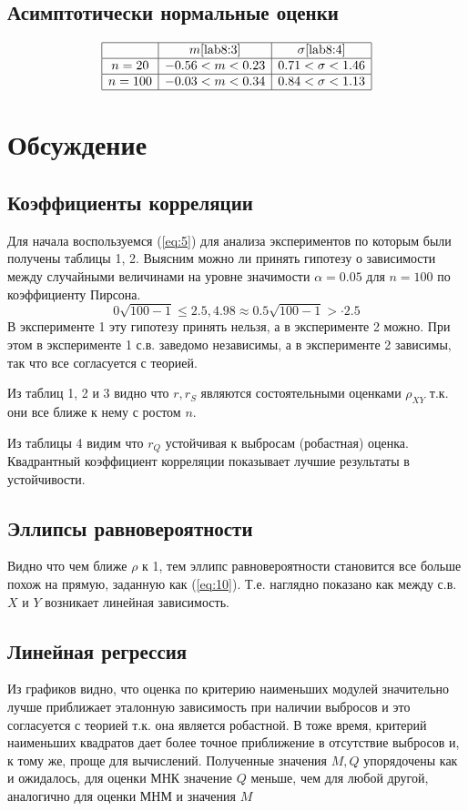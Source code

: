 \documentclass[12pt,a4paper]{article}
\begin{document}
\subsection{Асимптотически нормальные оценки}
\begin{equation*}
\begin{array}{|c|c|c|}
\hline 		& m\eqref{lab8:3} 	& \sigma\eqref{lab8:4} \\
\hline n=20	& -0.56 < m < 0.23 	& 0.71 < \sigma < 1.46 \\
\hline n=100& -0.03 < m < 0.34 	& 0.84 < \sigma < 1.13 \\
\hline
\end{array}
\end{equation*}
\pagebreak

\section{Обсуждение}
\subsection{Коэффициенты корреляции}
Для начала воспользуемся (\ref{eq:5}) для анализа экспериментов по которым были получены таблицы 1, 2. Выясним можно ли принять гипотезу о зависимости между случайными величинами на уровне значимости $\alpha = 0.05$ для $n = 100$ по коэффициенту Пирсона.
$$0 \sqrt{100 - 1} \leq 2.5, 4.98 \approx 0.5 \sqrt{100 - 1} > \cdot 2.5$$ 
В эксперименте 1 эту гипотезу принять нельзя, а в эксперименте 2 можно. При этом в эксперименте 1 с.в. заведомо независимы, а в эксперименте 2 зависимы, так что все согласуется с теорией. 

Из таблиц 1, 2 и 3 видно что $r, r_S$ являются состоятельными оценками $\rho_{XY}$ т.к. они все ближе к нему с ростом $n$.

Из таблицы 4 видим что $r_Q$ устойчивая к выбросам (робастная) оценка. Квадрантный коэффициент корреляции показывает лучшие результаты в устойчивости.

\subsection{Эллипсы равновероятности}
Видно что чем ближе $\rho$ к 1, тем эллипс равновероятности становится все больше похож на прямую, заданную как (\ref{eq:10}). Т.е. наглядно показано как между с.в. $X$ и $Y$ возникает линейная зависимость.

\subsection{Линейная регрессия}
Из графиков видно, что оценка по критерию наименьших модулей значительно лучше приближает эталонную зависимость при наличии выбросов и это согласуется с теорией т.к. она является робастной. В тоже время, критерий наименьших квадратов дает более точное приближение в отсутствие выбросов и, к тому же, проще для вычислений. Полученные значения $M, Q$ упорядочены как и ожидалось, для оценки МНК значение $Q$ меньше, чем для любой другой, аналогично для оценки МНМ и значения $M$ 
\end{document}
